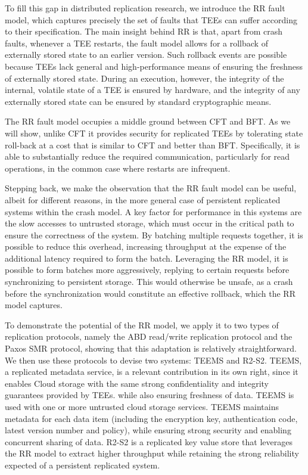 To fill this gap in distributed replication research, we
introduce the \ac{RR} fault model, which
captures precisely the set of faults that \acp{TEE} can suffer according to
their specification.  The main insight behind \ac{RR} is that,
apart from crash faults, whenever a \ac{TEE} restarts, the fault model
allows for a rollback of externally stored state to an earlier
version.  Such rollback events are possible because \acp{TEE} lack general
and high-performance means of ensuring the freshness of externally
stored state.  During an execution, however, the integrity of the
internal, volatile state of a \ac{TEE} is ensured by hardware, and the
integrity of any externally stored state can be ensured by standard
cryptographic means.

The \ac{RR} fault model occupies a middle ground between \ac{CFT}
and \ac{BFT}. As we will show, unlike CFT it provides
security for replicated \acp{TEE} by tolerating state roll-back at a cost
that is similar to \ac{CFT} and better than \ac{BFT}. Specifically, it is able
to substantially reduce the required communication, particularly for
read operations, in the common case where restarts are
infrequent.

Stepping back, we make the observation that the \ac{RR} fault
model can be useful, albeit for different reasons, in the more
general case of persistent replicated systems within the crash
model. A key factor for performance in this systems are the slow
accesses to untrusted storage, which must occur in the critical
path to ensure the correctness of the system. By batching
multiple requests together, it is possible to reduce this
overhead, increasing throughput at the expense of the additional
latency required to form the batch. Leveraging the \ac{RR} model,
it is possible to form batches more aggressively, replying to
certain requests before synchronizing to persistent storage. This
would otherwise be unsafe, as a crash before the synchronization
would constitute an effective rollback, which the \ac{RR} model
captures.

To demonstrate the potential of the \ac{RR} model, we apply it to
two types of replication protocols, namely the \ac{ABD}
 read/write replication protocol and the Paxos \ac{SMR}
protocol, showing that this adaptation is relatively straightforward.
We then use these protocols to devise two systems: \ac{TEEMS} and
\ac{R2-S2}. \ac{TEEMS}, a replicated metadata service,
is a relevant contribution in its own right, since
it enables Cloud storage with the same strong confidentiality and
integrity guarantees provided by \acp{TEE}. while also ensuring freshness
of data. \ac{TEEMS} is used with one or more untrusted cloud storage
services. \ac{TEEMS} maintains metadata for each data item (including the
encryption key, authentication code, latest version number and
policy), while ensuring strong security and enabling concurrent
sharing of data. \ac{R2-S2} is a replicated key value store that
leverages the \ac{RR} model to extract higher throughput while
retaining the strong reliability expected of a persistent
replicated system.

